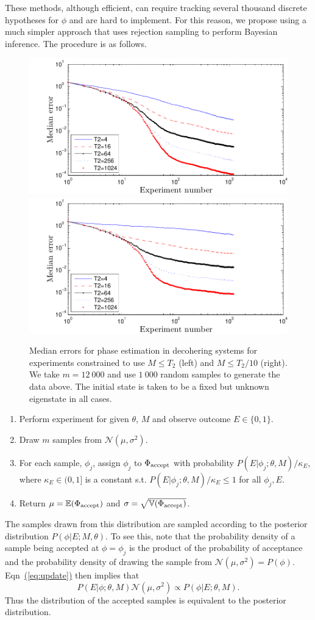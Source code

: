 \documentclass[aps,pra,amsmath,twocolumn,amssymb,superscriptaddress]{revtex4-1}
\newcommand{\eq}[1]{\hyperref[eq:#1]{(\ref*{eq:#1})}}
\begin{document}
These methods, although efficient, can require tracking several thousand
discrete hypotheses for $\phi$ and are hard to implement.  For this reason, we
propose using a much simpler approach that uses rejection sampling to perform
Bayesian inference.  The procedure is as follows.

\begin{figure}
    \begin{centering}
\includegraphics[width=0.45\linewidth]{T2plot_full.pdf}
        \includegraphics[width=0.45\linewidth]{T2plot.pdf}
    \end{centering}
    \caption{\label{fig:T2plot}
Median errors for phase estimation in decohering systems for experiments constrained to use $M\le T_2$ (left) and $M\le T_2/10$ (right).  We take $m=12~000$ and use $1~000$ random samples to generate the data above.  The initial state is taken to be a fixed but unknown eigenstate in all cases.
    }
\end{figure}

\begin{enumerate}
\item Perform experiment for given $\theta$, $M$ and observe outcome $E\in \{0,1\}$.
\item Draw $m$ samples from $\mathcal{N}(\mu,\sigma^2)$.
\item For each sample, $\phi_j$, assign $\phi_j$ to $\Phi_{\rm accept}$ with probability $P(E|\phi_j;\theta,M)/\kappa_E$, where $\kappa_E\in (0,1]$ is a constant s.t. $P(E|\phi_j;\theta,M)/\kappa_E\le 1$ for all $\phi_j,E$.
\item Return $\mu = \mathbb{E}(\Phi_{\rm accept})$ and $\sigma =\sqrt{\mathbb{V}(\Phi_{\rm accept})}$.
\end{enumerate}

The samples drawn from this distribution are sampled according to the posterior distribution
$P(\phi|E;M,\theta)$.  To see this, note that the probability density of a sample being accepted at $\phi=\phi_j$ is the product of the probability of acceptance and the probability density of drawing the sample from $\mathcal{N}(\mu,\sigma^2)=P(\phi)$.  Eqn~\eq{update} then implies that
\begin{equation}
    P(E | \phi; \theta, M) \mathcal{N}(\mu,\sigma^2) \propto P(\phi | E; \theta, M).
\end{equation}
Thus the distribution of the accepted samples is equivalent to the posterior distribution.  
\end{document}
